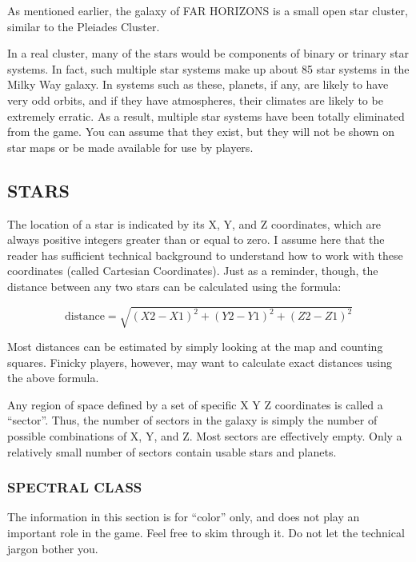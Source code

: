\documentclass[10pt,titlepage]{article}
\begin{document}
As mentioned earlier, the galaxy of FAR HORIZONS is a small open star cluster,
similar to the Pleiades Cluster.

In a real cluster, many of the stars would be components of binary or trinary
star systems.  In fact, such multiple star systems make up about 85%
star systems in the Milky Way galaxy.  In systems such as these, planets, if
any, are likely to have very odd orbits, and if they have atmospheres, their
climates are likely to be extremely erratic.  As a result, multiple star
systems have been totally eliminated from the game.  You can assume that they
exist, but they will not be shown on star maps or be made available for use
by players.


\subsection{STARS}

The location of a star is indicated by its X, Y, and Z coordinates, which are
always positive integers greater than or equal to zero.  I assume here that the
reader has sufficient technical background to understand how to work with these
coordinates (called Cartesian Coordinates).  Just as a reminder, though, the
distance between any two stars can be calculated using the formula:

\begin{equation*}
      \textrm{distance}  =  \sqrt{ (X2 - X1)^2   +  (Y2 - Y1)^2   +  (Z2 - Z1)^2 }
\end{equation*}

Most distances can be estimated by simply looking at the map and counting
squares.  Finicky players, however, may want to calculate exact distances using
the above formula.

Any region of space defined by a set of specific X Y Z coordinates is called a
``sector''.  Thus, the number of sectors in the galaxy is simply the number of
possible combinations of X, Y, and Z.  Most sectors are effectively empty.
Only a relatively small number of sectors contain usable stars and planets.


\subsubsection{SPECTRAL CLASS}

The information in this section is for ``color'' only, and does not play an
important role in the game.  Feel free to skim through it.  Do not let the
technical jargon bother you.
\end{document}
